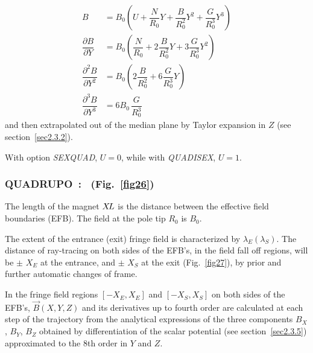 \begin{align*}
	B &   =     B_0
	           \left(U+ \dfrac{N }{ R_0}Y + 
	                \dfrac{B }{ R^2_0} Y^2+ \dfrac{G }{ R^3_0} Y^3 \right)  \\
	\dfrac{ \partial B }{ \partial Y} 
	   &   =   B_0 \left(
	             \dfrac{N }{ R_0} + 2 \dfrac{B }{ R^2_0} Y + 3\dfrac{G }{ R^3_0}Y^2 \right) \\  
	\dfrac{ \partial^ 2B }{ \partial Y^2} 
	  &  =     B_0 \left(2 \dfrac{B }{ R^2_0} + 6\dfrac{G }{ R^3_0} Y \right) \\
	\dfrac{ \partial^ 3B }{ \partial Y^3}  
	   & =     6B_0 \,  \dfrac{G }{ R^3_0}
\end{align*}  
    and then extrapolated out of the median plane by Taylor expansion in $ Z $ 
(see section~\ref{sec2.3.2}).
\bigskip

\noindent With option \textsl{SEXQUAD}, $ U=0$,  while with \textsl{QUADISEX}, $U=1 $. 

\newpage

\subsubsection*{QUADRUPO~:  \QUADRUPOTitl\  (Fig.~\protect\ref{fig26}) } \label{QUADRUPO}  

The length of the magnet $ X\!L $ is the distance between the
effective field boundaries (EFB). The field at the pole tip $ R_0 $ is $ B_0 $. 

\noindent The extent of the  entrance (exit) fringe field is characterized by 
$ \lambda_ E(\lambda_ S) $.  The distance of ray-tracing on both sides of the
EFB's, in the field fall off regions, will be $\pm$  $ X_E $ at 
the entrance, and $\pm$  $ X_S $ at the exit (Fig.~\ref{fig27}),  
by prior and further automatic 
changes of frame. 

\noindent In the fringe field  regions $[ -X_E,X_E ]$  and 
$[ -X_S,X_S ]$ on both sides of the EFB's, $ \vec  B(X,Y,Z) $ and its derivatives up to
fourth order are calculated at each step of the trajectory from the analytical expressions 
of the three components $ B_X $, $ B_Y $, $ B_Z $ obtained by differentiation
of the scalar potential (see section~\ref{sec2.3.5}) approximated to the 8th order in $ Y $ 
and $ Z $. 

